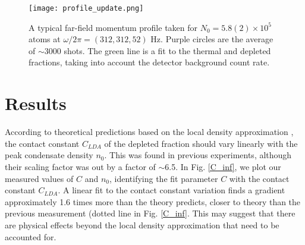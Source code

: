 \documentclass[%
	 aps,%
	 prl,%
	 a4paper,%
	 amsmath,amssymb,%
	 preprint,%
	 reprint,%
]{revtex4-1}
\newcommand{\com}[1]{{\color{red}{#1}\normalcolor}} %
\begin{document}
\begin{figure}[b]
\centering
\texttt{[image: profile\_update.png]}
\caption{
A typical far-field momentum profile taken for $N_0 = 5.8(2)\times 10^5$ atoms at $\omega/2\pi = (312,312,52)$ Hz. Purple circles are the average of $\sim 3000$ shots. The green line is a fit to the thermal and depleted fractions, taking into account the detector background count rate.  %
}
\label{k_profile}
\end{figure}

\section{Results}


According to theoretical predictions based on the local density approximation \cite{Chang2016}, the contact constant $C_{LDA}$ of the depleted fraction should vary linearly with the peak condensate density $n_0$.  This was found in previous experiments\cite{Chang2016}, although their scaling factor was out by a factor of $\sim$6.5. In Fig. \ref{C_inf}, we plot our measured values of $C$ and $n_0$, identifying the fit parameter $C$ with the contact constant $C_{LDA}$. A linear fit to the contact constant variation finds a gradient approximately 1.6 times more than the theory predicts, closer to theory than the previous measurement \cite{Chang2016} (dotted line in Fig. \ref{C_inf}. This may suggest that there are physical effects beyond the local density approximation that need to be accounted for.  
\end{document}
